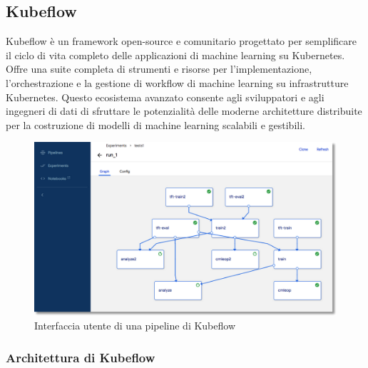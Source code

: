 % 
% 
% 



\subsection{Kubeflow}

Kubeflow è un framework open-source e comunitario progettato per semplificare il ciclo di vita completo delle applicazioni di machine learning su Kubernetes. Offre una suite completa di strumenti e risorse per l'implementazione, l'orchestrazione e la gestione di workflow di machine learning su infrastrutture Kubernetes. Questo ecosistema avanzato consente agli sviluppatori e agli ingegneri di dati di sfruttare le potenzialità delle moderne architetture distribuite per la costruzione di modelli di machine learning scalabili e gestibili.

\begin{figure}[h]
    \centering
    \includegraphics[width=\linewidth]{figures/ch3/kubeflow-ui.png}
    \caption[Interfaccia utente di una pipeline di Kubeflow]{Interfaccia utente di una pipeline di Kubeflow}
    \label{fig:cha3:kf-arch}
\end{figure}

\subsubsection{Architettura di Kubeflow}

